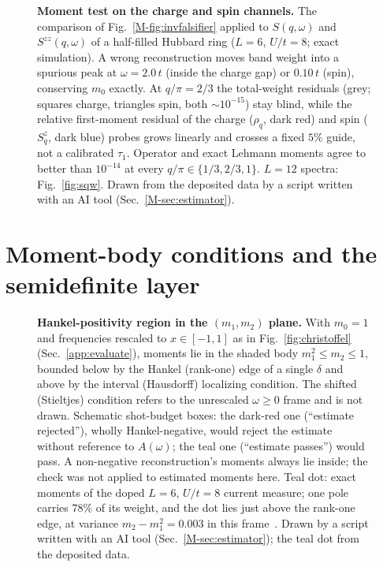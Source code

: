 \documentclass[aps,prb,onecolumn,superscriptaddress,longbibliography,floatfix]{revtex4-2}
\newcommand{\onecolfig}{\setlength{\columnwidth}{0.65\textwidth}}
\begin{document}
\begin{figure}[t]
\centering\onecolfig

\caption{\textbf{Moment test on the charge and spin channels.} The comparison of Fig.~\ref{M-fig:invfalsifier} applied to $S(q,\omega)$ and $S^{zz}(q,\omega)$ of a half-filled Hubbard ring ($L=6$, $U/t=8$; exact simulation). A wrong reconstruction moves band weight into a spurious peak at $\omega=2.0\,t$ (inside the charge gap) or $0.10\,t$ (spin), conserving $m_0$ exactly. At $q/\pi=2/3$ the total-weight residuals (grey; squares charge, triangles spin, both ${\sim}10^{-15}$) stay blind, while the relative first-moment residual of the charge ($\rho_q$, dark red) and spin ($S^z_q$, dark blue) probes grows linearly and crosses a fixed $5\%$ guide, not a calibrated $\tau_1$. Operator and exact Lehmann moments agree to better than $10^{-14}$ at every $q/\pi\in\{1/3,2/3,1\}$. $L=12$ spectra: Fig.~\ref{fig:sqw}. Drawn from the deposited data by a script written with an AI tool (Sec.~\ref{M-sec:estimator}).}
\label{fig:collective_screen}
\end{figure}

\section{Moment-body conditions and the semidefinite layer}
\label{app:stack}
\label{sec:stack}
\begin{figure}[t]
\centering\onecolfig

\caption{\textbf{Hankel-positivity region in the $(m_1,m_2)$ plane.} With $m_0=1$ and frequencies rescaled to $x\in[-1,1]$ as in Fig.~\ref{fig:christoffel} (Sec.~\ref{app:evaluate}), moments lie in the shaded body $m_1^2\le m_2\le 1$, bounded below by the Hankel (rank-one) edge of a single $\delta$ and above by the interval (Hausdorff) localizing condition. The shifted (Stieltjes) condition refers to the unrescaled $\omega\ge0$ frame and is not drawn. Schematic shot-budget boxes: the dark-red one (``estimate rejected''), wholly Hankel-negative, would reject the estimate without reference to $A(\omega)$; the teal one (``estimate passes'') would pass. A non-negative reconstruction's moments always lie inside; the check was not applied to estimated moments here. Teal dot: exact moments of the doped $L=6$, $U/t=8$ current measure; one pole carries $78\%$ of its weight, and the dot lies just above the rank-one edge, at variance $m_2-m_1^2=0.003$ in this frame~\cite{ShohatTamarkin1943,Akhiezer1965}. Drawn by a script written with an AI tool (Sec.~\ref{M-sec:estimator}); the teal dot from the deposited data.}
\label{fig:momentcone}
\end{figure}
\end{document}
